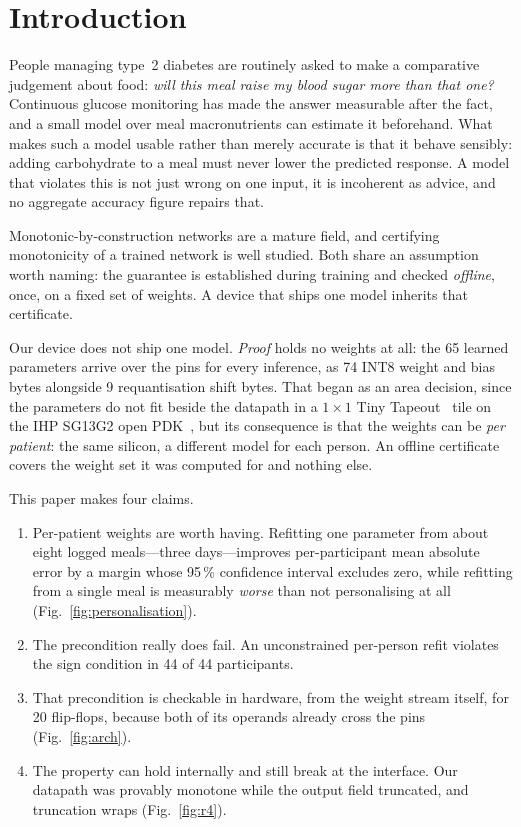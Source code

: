 \documentclass[conference]{IEEEtran}
\begin{document}
\section{Introduction}

People managing type~2 diabetes are routinely asked to make a comparative
judgement about food: \emph{will this meal raise my blood sugar more than that
one?} Continuous glucose monitoring has made the answer measurable after the
fact, and a small model over meal macronutrients can estimate it beforehand.
What makes such a model usable rather than merely accurate is that it behave
sensibly: adding carbohydrate to a meal must never lower the predicted
response. A model that violates this is not just wrong on one input, it is
incoherent as advice, and no aggregate accuracy figure repairs that.

Monotonic-by-construction networks are a mature field, and certifying
monotonicity of a trained network is well studied. Both share an assumption
worth naming: the guarantee is established during training and checked
\emph{offline}, once, on a fixed set of weights. A device that ships one model
inherits that certificate.

Our device does not ship one model. \emph{Proof} holds no weights at all: the
65 learned parameters arrive over the pins for every inference, as 74 INT8
weight and bias bytes alongside 9 requantisation shift bytes. That began as an
area decision, since the parameters do not fit beside the datapath in a
$1\times1$ Tiny Tapeout~\cite{tinytapeout} tile on the IHP SG13G2 open
PDK~\cite{ihp}, but its consequence is that the weights can be
\emph{per patient}: the same silicon, a different model for each person. An
offline certificate covers the weight set it was computed for and nothing else.

This paper makes four claims.

\begin{enumerate}
\item Per-patient weights are worth having. Refitting one parameter from about
eight logged meals---three days---improves per-participant mean absolute error
by a margin whose 95\,\% confidence interval excludes zero, while refitting
from a single meal is measurably \emph{worse} than not personalising at all
(Fig.~\ref{fig:personalisation}).

\item The precondition really does fail. An unconstrained per-person refit
violates the sign condition in 44 of 44 participants.

\item That precondition is checkable in hardware, from the weight stream
itself, for 20 flip-flops, because both of its operands already cross the pins
(Fig.~\ref{fig:arch}).

\item The property can hold internally and still break at the interface. Our
datapath was provably monotone while the output field truncated, and truncation
wraps (Fig.~\ref{fig:r4}).
\end{enumerate}
\end{document}
